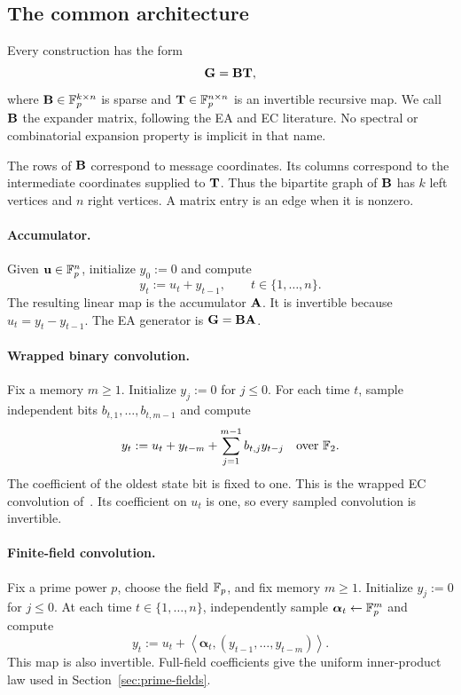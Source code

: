 \subsection{The common architecture}

Every construction has the form
\begin{equation}
 \mathbf G=\mathbf B\mathbf T,
 \label{eq:common-architecture}
\end{equation}
where $\mathbf B\in\mathbb F_p^{k\times n}$ is sparse and
$\mathbf T\in\mathbb F_p^{n\times n}$ is an invertible recursive map.  We call $\mathbf B$ the
expander matrix, following the EA and EC literature.  No spectral or
combinatorial expansion property is implicit in that name.

The rows of $\mathbf B$ correspond to message coordinates.  Its columns correspond
to the intermediate coordinates supplied to $\mathbf T$.  Thus the bipartite graph
of $\mathbf B$ has $k$ left vertices and $n$ right vertices.  A matrix entry is an
edge when it is nonzero.

\paragraph{Accumulator.}
Given $\mathbf u\in\mathbb F_p^n$, initialize $y_0:=0$ and compute
\begin{equation}
 y_t:=u_t+y_{t-1},\qquad t\in\{1,\ldots,n\}.
 \label{eq:accumulator-definition}
\end{equation}
The resulting linear map is the accumulator $\mathbf A$.  It is invertible because
$u_t=y_t-y_{t-1}$.  The EA generator is $\mathbf G=\mathbf B\mathbf A$.

\paragraph{Wrapped binary convolution.}
Fix a memory $m\geq1$.  Initialize $y_j:=0$ for $j\leq0$.  For each time
$t$, sample independent bits $b_{t,1},\ldots,b_{t,m-1}$ and compute
\begin{equation}
 y_t:=u_t+y_{t-m}+\sum_{j=1}^{m-1}b_{t,j}y_{t-j}
 \quad\text{over }\mathbb F_2.
 \label{eq:wrapped-convolution}
\end{equation}
The coefficient of the oldest state bit is fixed to one.  This is the wrapped
EC convolution of~\cite{EC}.  Its coefficient on $u_t$ is one, so every
sampled convolution is invertible.

\paragraph{Finite-field convolution.}
Fix a prime power $p$, choose the field $\mathbb F_p$, and fix memory $m\geq1$.
Initialize $y_j:=0$ for $j\leq0$.  At each time $t\in\{1,\ldots,n\}$,
independently sample $\boldsymbol\alpha_t\gets\mathbb F_p^m$ and compute
\begin{equation}
 y_t:=u_t+
 \left\langle\boldsymbol\alpha_t,
 (y_{t-1},\ldots,y_{t-m})\right\rangle.
 \label{eq:prime-convolution}
\end{equation}
This map is also invertible.  Full-field coefficients give the uniform
inner-product law used in Section~\ref{sec:prime-fields}.

